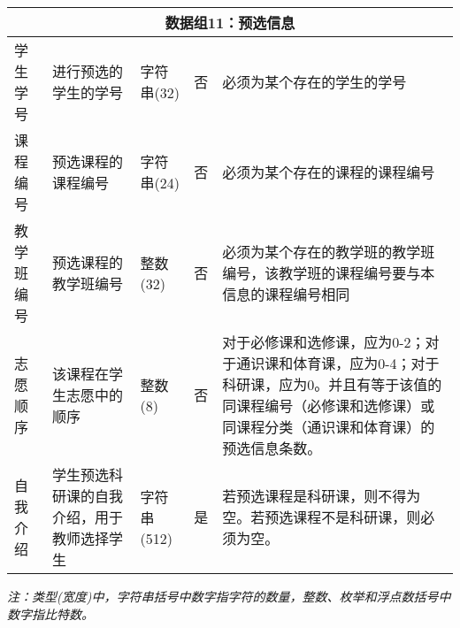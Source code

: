 \begin{center}
\begin{longtable}{p{6em}p{16em}p{8em}@{}p{2em}p{16em}}
        \multicolumn{5}{c}{\textbf{数据组11：预选信息}} \\
        \midrule
        学生学号 & 进行预选的学生的学号 & 字符串(32) & 否 & 必须为某个存在的学生的学号 \\
        课程编号 & 预选课程的课程编号 & 字符串(24) & 否 & 必须为某个存在的课程的课程编号 \\
        教学班编号 & 预选课程的教学班编号 & 整数(32) & 否 & 必须为某个存在的教学班的教学班编号，该教学班的课程编号要与本信息的课程编号相同 \\
        志愿顺序 & 该课程在学生志愿中的顺序 & 整数(8) & 否 & 对于必修课和选修课，应为0-2；对于通识课和体育课，应为0-4；对于科研课，应为0。并且有等于该值的同课程编号（必修课和选修课）或同课程分类（通识课和体育课）的预选信息条数。\\
        自我介绍 & 学生预选科研课的自我介绍，用于教师选择学生 & 字符串(512) & 是 & 若预选课程是科研课，则不得为空。若预选课程不是科研课，则必须为空。 \\
    \end{longtable}
    \textit{注：类型(宽度)中，字符串括号中数字指字符的数量，整数、枚举和浮点数括号中数字指比特数。}
\end{center}
